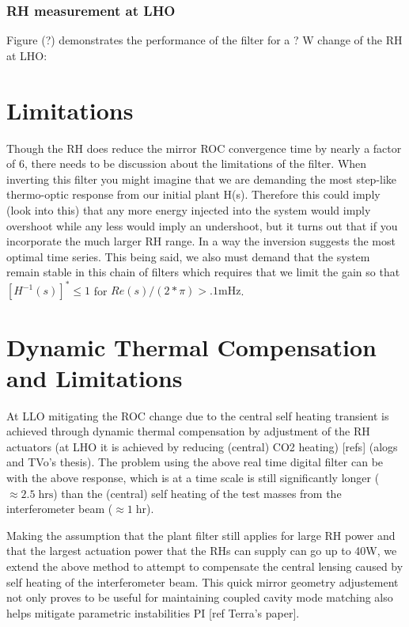 \documentclass[colorlinks=true,pdfstartview=FitV,linkcolor=blue,
            citecolor=magenta,urlcolor=red]{ligodoc}
\begin{document}
\subsubsection{RH measurement at LHO}
Figure (?) demonstrates the performance of the filter for a ? W change of the RH at LHO:



\section{Limitations}
Though the RH does reduce the mirror ROC convergence time by nearly a factor of 6, there needs to be discussion about the limitations of the filter. When inverting this filter you might imagine that we are demanding the most step-like thermo-optic response from our initial plant H(s). Therefore this could imply (look into this) that any more energy injected into the system would imply overshoot while any less would imply an undershoot, but it turns out that if you incorporate the much larger RH range. In a way the inversion suggests the most optimal time series.  This being said, we also must demand that the system remain stable in this chain of filters which requires that we limit the gain so that $[H^{-1}(s)]^{*} \leq 1$ for $Re(s)/(2*\pi)>.1 \mathrm{mHz}$.


\section{Dynamic Thermal Compensation and Limitations}
At LLO mitigating the ROC change due to the central self heating transient is achieved through dynamic thermal compensation by adjustment of the RH actuators (at LHO it is achieved by reducing (central) CO2 heating) [refs] (alogs and TVo's thesis). The problem using the above real time digital filter can be with the above response, which is at a time scale is still significantly longer ($\approx 2.5\;\mathrm{hrs}$) than the (central) self heating of the test masses from the interferometer beam ($\approx 1\; \mathrm{hr}$).

Making the assumption that the plant filter still applies for large RH power and that the largest actuation power that the RHs can supply can go up to 40W, we extend the above method to attempt to compensate the central lensing caused by self heating of the interferometer beam. This quick mirror geometry adjustement not only proves to be useful for maintaining coupled cavity mode matching also helps mitigate parametric instabilities PI [ref Terra's paper].
\end{document}
